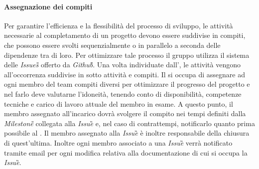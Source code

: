 	\paragraph{Assegnazione dei compiti}
	Per garantire l'efficienza e la flessibilità del processo di sviluppo, le attività necessarie al completamento di un progetto devono essere suddivise in compiti, che possono essere svolti sequenzialmente o in parallelo a seconda delle dipendenze tra di loro. Per ottimizzare tale processo il gruppo utilizza il sistema delle \emph{Issues\G{}} offerto da \emph{Github\G}.	
	Una volta individuate dall'\Ana{}, le attività vengono all'occorrenza suddivise in sotto attività e compiti. Il \RdP{} si occupa di assegnare ad ogni membro del team compiti diversi per ottimizzare il progresso del progetto e nel farlo deve valutarne l'idoneità, tenendo conto di disponibilità, competenze tecniche e carico di lavoro attuale del membro in esame. A questo punto, il membro assegnato all'incarico dovrà svolgere il compito nei tempi definiti dalla \emph{Milestone\G{}} collegata alla \emph{Issue}\G{} e, nel caso di contrattempi, notificarlo quanto prima possibile al \RdP{}. Il membro assegnato alla \emph{Issue}\G{} è inoltre responsabile della chiusura di quest'ultima. Inoltre ogni membro associato a una \emph{Issue}\G{} verrà notificato tramite email per ogni modifica relativa alla documentazione %
	di cui si occupa la \emph{Issue}\G{}.
